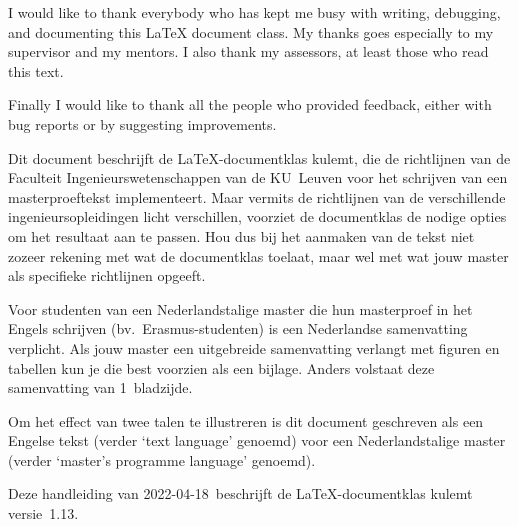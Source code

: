\documentclass[master=elt,masteroption=im,english,oneside]{kulemt}
\newcommand*\classversion{1.13}
\newcommand*\manualdate{2022-04-18}
\newcommand*\cls[1]{\textsf{#1}}
\newcommand\English[1]{`\foreignlanguage{english}{#1}'}
\begin{document}
\begin{preface}
  I would like to thank everybody who has kept me busy with writing,
  debugging, and documenting this LaTeX document class. My thanks goes
  especially to my supervisor and my mentors. I also thank my assessors,
  at least those who read this text.

  Finally I would like to thank all the people who provided feedback,
  either with bug reports or by suggesting improvements.
\end{preface}

\tableofcontents*

\begin{abstract}
  This document describes the use of the LaTeX document class \cls{kulemt},
  which implements the KU~Leuven Faculty of Engineering guidelines for writing
  a master's thesis. Since there are slight differences between the actual
  guidelines of the different engineering master's programmes, this class
  implements not only the common part, but it also provides the necessary
  options to adapt it to the specific requirements. So please check the
  guidelines of your master's programme before using or tweaking typesetting
  options.

  To illustrate the difference between the main text language and the master's
  programme language, this document is written in English (as the main text
  language) for a Dutch master's programme.

  This manual (dated \manualdate) describes the \cls{kulemt} class
  version~\classversion.
\end{abstract}

\begin{abstract*}
  Dit document beschrijft de LaTeX-documentklas \cls{kulemt}, die de
  richtlijnen van de Faculteit Ingenieurswetenschappen van de KU~Leuven
  voor het schrijven van een masterproeftekst implementeert. Maar vermits
  de richtlijnen van de verschillende ingenieursopleidingen licht
  verschillen, voorziet de documentklas de nodige opties om het resultaat
  aan te passen. Hou dus bij het aanmaken van de tekst niet zozeer rekening
  met wat de documentklas toelaat, maar wel met wat jouw master als
  specifieke richtlijnen opgeeft.

  Voor studenten van een Nederlandstalige master die hun masterproef in het
  Engels schrijven (bv.\ Erasmus-studenten) is een Nederlandse samenvatting
  verplicht. Als jouw master een uitgebreide samenvatting verlangt met
  figuren en tabellen kun je die best voorzien als een bijlage. Anders
  volstaat deze samenvatting van 1~bladzijde.

  Om het effect van twee talen te illustreren is dit document geschreven
  als een Engelse tekst (verder \English{text language} genoemd) voor een
  Nederlandstalige master (verder \English{master's programme language}
  genoemd).

  Deze handleiding van \manualdate\ beschrijft de LaTeX-documentklas
  \cls{kulemt} versie~\classversion.
\end{abstract*}
\end{document}
